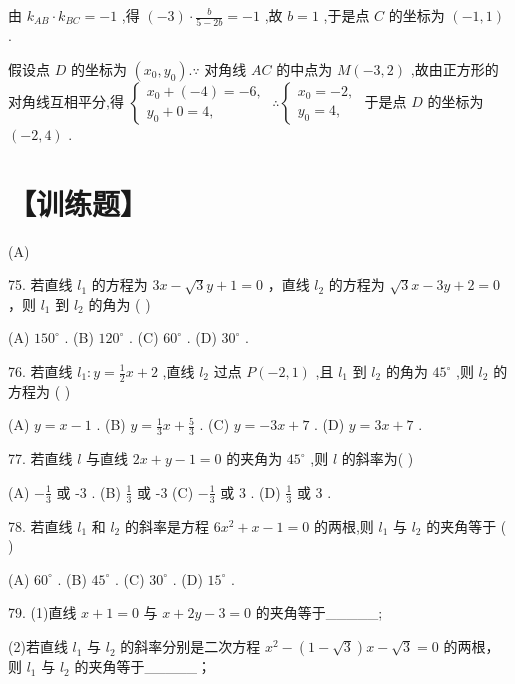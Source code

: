 \documentclass[10pt]{article}
\begin{document}
由 \({k}_{AB} \cdot  {k}_{BC} =  - 1\) ,得 \(\left( {-3}\right)  \cdot  \frac{b}{5 - {2b}} =  - 1\) ,故 \(b = 1\) ,于是点 \(C\) 的坐标为 \(\left( {-1,1}\right)\) .

假设点 \(D\) 的坐标为 \(\left( {{x}_{0},{y}_{0}}\right) .\because\) 对角线 \({AC}\) 的中点为 \(M\left( {-3,2}\right)\) ,故由正方形的对角线互相平分,得 \(\left\{  {\begin{array}{l} {x}_{0} + \left( {-4}\right)  =  - 6, \\  {y}_{0} + 0 = 4, \end{array}\;\therefore \left\{  \begin{array}{l} {x}_{0} =  - 2, \\  {y}_{0} = 4, \end{array}\right. }\right.\) 于是点 \(D\) 的坐标为 \(\left( {-2,4}\right)\) .

\section*{【训练题】}

(A)

75. 若直线 \({l}_{1}\) 的方程为 \({3x} - \sqrt{3}y + 1 = 0\) ，直线 \({l}_{2}\) 的方程为 \(\sqrt{3}x - {3y} + 2 = 0\) ，则 \({l}_{1}\) 到 \({l}_{2}\) 的角为 ( )

(A) \({150}^{ \circ  }\) . (B) \({120}^{ \circ  }\) . (C) \({60}^{ \circ  }\) . (D) \({30}^{ \circ  }\) .

76. 若直线 \({l}_{1} : y = \frac{1}{2}x + 2\) ,直线 \({l}_{2}\) 过点 \(P\left( {-2,1}\right)\) ,且 \({l}_{1}\) 到 \({l}_{2}\) 的角为 \({45}^{ \circ  }\) ,则 \({l}_{2}\) 的方程为 ( )

(A) \(y = x - 1\) . (B) \(y = \frac{1}{3}x + \frac{5}{3}\) . (C) \(y =  - {3x} + 7\) . (D) \(y = {3x} + 7\) .

77. 若直线 \(l\) 与直线 \({2x} + y - 1 = 0\) 的夹角为 \({45}^{ \circ  }\) ,则 \(l\) 的斜率为( )

(A) \(- \frac{1}{3}\) 或 -3 . (B) \(\frac{1}{3}\) 或 -3 (C) \(- \frac{1}{3}\) 或 3 . (D) \(\frac{1}{3}\) 或 3 .

78. 若直线 \({l}_{1}\) 和 \({l}_{2}\) 的斜率是方程 \(6{x}^{2} + x - 1 = 0\) 的两根,则 \({l}_{1}\) 与 \({l}_{2}\) 的夹角等于 ( )

(A) \({60}^{ \circ  }\) . (B) \({45}^{ \circ  }\) . (C) \({30}^{ \circ  }\) . (D) \({15}^{ \circ  }\) .

79. (1)直线 \(x + 1 = 0\) 与 \(x + {2y} - 3 = 0\) 的夹角等于\_\_\_\_\_;

(2)若直线 \({l}_{1}\) 与 \({l}_{2}\) 的斜率分别是二次方程 \({x}^{2} - \left( {1 - \sqrt{3}}\right) x - \sqrt{3} = 0\) 的两根，则 \({l}_{1}\) 与 \({l}_{2}\) 的夹角等于\_\_\_\_\_；
\end{document}
